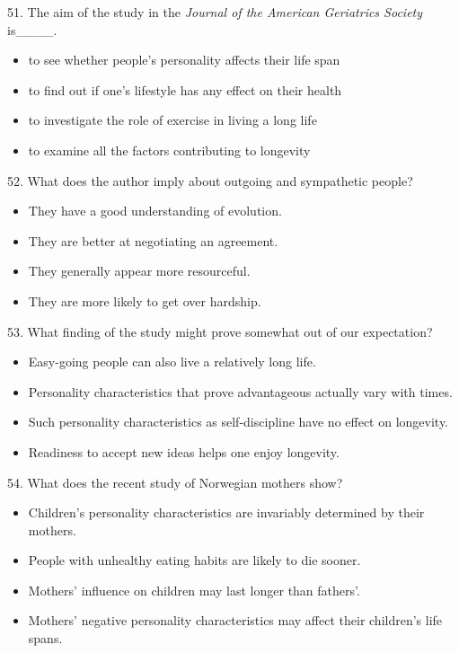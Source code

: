\documentclass[UTF8,11pt]{ctexart}
\begin{document}
51. The aim of the study in the\textit{ Journal of the American Geriatrics Society} is\_\_\_\_.


\begin{itemize}[leftmargin=2em,itemsep=.2em,topsep=.4em]\item[A.] to see whether people's personality affects their life span
\item[B.] to find out if one's lifestyle has any effect on their health
\item[C.] to investigate the role of exercise in living a long life
\item[D.] to examine all the factors contributing to longevity
\end{itemize}

52. What does the author imply about outgoing and sympathetic people?


\begin{itemize}[leftmargin=2em,itemsep=.2em,topsep=.4em]\item[A.] They have a good understanding of evolution.
\item[B.] They are better at negotiating an agreement.
\end{itemize}

\begin{itemize}[leftmargin=2em,itemsep=.2em,topsep=.4em]\item[C.] They generally appear more resourceful.
\item[D.] They are more likely to get over hardship.
\end{itemize}

53. What finding of the study might prove somewhat out of our expectation?


\begin{itemize}[leftmargin=2em,itemsep=.2em,topsep=.4em]\item[A.] Easy-going people can also live a relatively long life.
\item[B.] Personality characteristics that prove advantageous actually vary with times.
\item[C.] Such personality characteristics as self-discipline have no effect on longevity.
\item[D.] Readiness to accept new ideas helps one enjoy longevity.
\end{itemize}

54. What does the recent study of Norwegian mothers show?


\begin{itemize}[leftmargin=2em,itemsep=.2em,topsep=.4em]\item[A.] Children's personality characteristics are invariably determined by their mothers.
\item[B.] People with unhealthy eating habits are likely to die sooner.
\item[C.] Mothers' influence on children may last longer than fathers'.
\item[D.] Mothers' negative personality characteristics may affect their children's life spans.
\end{itemize}
\end{document}

